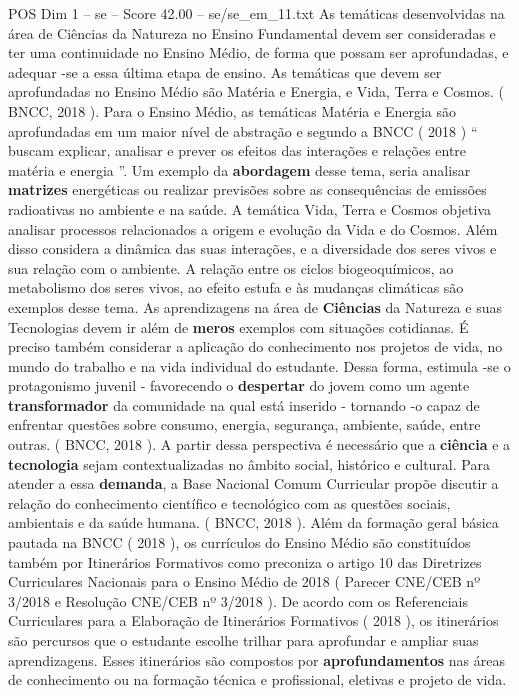 \begin{textsample}{POS Dim 1 – se – Score 42.00 – se/se\_em\_11.txt}
As temáticas desenvolvidas na área de Ciências da Natureza no Ensino Fundamental devem ser consideradas e ter uma continuidade no Ensino Médio, de forma que possam ser aprofundadas, e adequar -se a essa última etapa de ensino.
As temáticas que devem ser aprofundadas no Ensino Médio são Matéria e Energia, e Vida, Terra e Cosmos. ( BNCC, 2018 ).
Para o Ensino Médio, as temáticas Matéria e Energia são aprofundadas em um maior nível de abstração e segundo a BNCC ( 2018 ) “ buscam explicar, analisar e prever os efeitos das interações e relações entre matéria e energia ”.
Um exemplo da \textbf{abordagem} desse tema, seria analisar \textbf{matrizes} energéticas ou realizar previsões sobre as consequências de emissões radioativas no ambiente e na saúde.
A temática Vida, Terra e Cosmos objetiva analisar processos relacionados a origem e evolução da Vida e do Cosmos.
Além disso considera a dinâmica das suas interações, e a diversidade dos seres vivos e sua relação com o ambiente.
A relação entre os ciclos biogeoquímicos, ao metabolismo dos seres vivos, ao efeito estufa e às mudanças climáticas são exemplos desse tema.
As aprendizagens na área de \textbf{Ciências} da Natureza e suas Tecnologias devem ir além de \textbf{meros} exemplos com situações cotidianas.
É preciso também considerar a aplicação do conhecimento nos projetos de vida, no mundo do trabalho e na vida individual do estudante.
Dessa forma, estimula -se o protagonismo juvenil - favorecendo o \textbf{despertar} do jovem como um agente \textbf{transformador} da comunidade na qual está inserido - tornando -o capaz de enfrentar questões sobre consumo, energia, segurança, ambiente, saúde, entre outras. ( BNCC, 2018 ).
A partir dessa perspectiva é necessário que a \textbf{ciência} e a \textbf{tecnologia} sejam contextualizadas no âmbito social, histórico e cultural.
Para atender a essa \textbf{demanda}, a Base Nacional Comum Curricular propõe discutir a relação do conhecimento científico e tecnológico com as questões sociais, ambientais e da saúde humana. ( BNCC, 2018 ).
Além da formação geral básica pautada na BNCC ( 2018 ), os currículos do Ensino Médio são constituídos também por Itinerários Formativos como preconiza o artigo 10 das Diretrizes Curriculares Nacionais para o Ensino Médio de 2018 ( Parecer CNE/CEB nº 3/2018 e Resolução CNE/CEB nº 3/2018 ).
De acordo com os Referenciais Curriculares para a Elaboração de Itinerários Formativos ( 2018 ), os itinerários são percursos que o estudante escolhe trilhar para aprofundar e ampliar suas aprendizagens.
Esses itinerários são compostos por \textbf{aprofundamentos} nas áreas de conhecimento ou na formação técnica e profissional, eletivas e projeto de vida.

\end{textsample}
